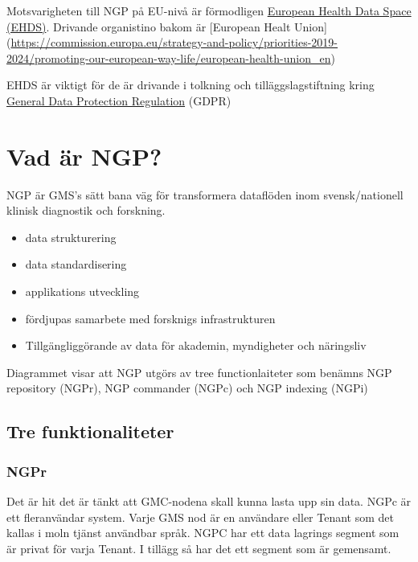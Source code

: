 \documentclass[
  letterpaper,
  DIV=11,
  numbers=noendperiod]{scrreprt}
\providecommand{\tightlist}{%
  \setlength{\itemsep}{0pt}\setlength{\parskip}{0pt}}\usepackage{longtable,booktabs,array}
\begin{document}
Motsvarigheten till NGP på EU-nivå är förmodligen
\href{https://health.ec.europa.eu/ehealth-digital-health-and-care/european-health-data-space_en}{European
Health Data Space (EHDS)}. Drivande organistino bakom är {[}European
Healt
Union{]}(\url{https://commission.europa.eu/strategy-and-policy/priorities-2019-2024/promoting-our-european-way-life/european-health-union_en})

EHDS är viktigt för de är drivande i tolkning och tilläggslagstiftning
kring \href{https://gdpr-info.eu/}{General Data Protection Regulation}
(GDPR)

\subsection{}\label{section}


\chapter{Vad är NGP?}\label{vad-uxe4r-ngp}

NGP är GMS's sätt bana väg för transformera dataflöden inom
svensk/nationell klinisk diagnostik och forskning.

\begin{itemize}
\tightlist
\item
  data strukturering
\item
  data standardisering
\item
  applikations utveckling
\item
  fördjupas samarbete med forsknigs infrastrukturen
\item
  Tillgängliggörande av data för akademin, myndigheter och näringsliv
\end{itemize}

Diagrammet visar att NGP utgörs av tree functionlaiteter som benämns NGP
repository (NGPr), NGP commander (NGPc) och NGP indexing (NGPi)

\section{Tre funktionaliteter}\label{tre-funktionaliteter}

\subsection{NGPr}\label{ngpr}

Det är hit det är tänkt att GMC-nodena skall kunna lasta upp sin data.
NGPc är ett fleranvändar system. Varje GMS nod är en användare eller
Tenant som det kallas i moln tjänst användbar språk. NGPC har ett data
lagrings segment som är privat för varja Tenant. I tillägg så har det
ett segment som är gemensamt.
\end{document}
